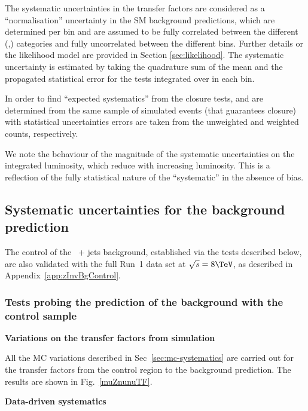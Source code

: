 The systematic uncertainties in the transfer factors are considered as
a ``normalisation'' uncertainty in the SM background predictions,
which are determined per \scalht bin and are
assumed to be fully correlated between the different (\njet,\nb)
categories and fully uncorrelated between the different \scalht bins. 
Further details or the likelihood model
are provided in Section \ref{sec:likelihood}. The systematic
uncertainty is estimated by taking the quadrature sum of the 
mean and the propagated statistical error for the tests integrated
over \njet in each \scalht bin.

In order to find ``expected systematics'' from the closure tests, \nobs and \npre are
determined from the same sample of simulated events (that guarantees
closure) with statistical uncertainties errors are taken from the
unweighted and weighted counts, respectively. 

We note the behaviour of the magnitude of the systematic uncertainties
on the integrated luminosity, which reduce with increasing
luminosity. This is a reflection of the fully statistical nature of
the ``systematic'' in the absence of bias.

\subsection{Systematic uncertainties for the \znunu background
prediction}

The control of the \znunu\ + jets background, established via the
tests described below, are also validated with the full Run~1 data set
at $\sqrt{s} = 8\tev$, as described in
Appendix~\ref{app:zInvBgControl}.

\subsubsection{Tests probing the prediction of the \znunu
background with the \mj control sample}
\label{sec:muZnunu}

{\bf Variations on the transfer factors from simulation}

All the MC variations described in Sec~\ref{sec:mc-systematics} are
carried out for the transfer factors from the \mj control region to
the \znunu background prediction. The results are shown in
Fig.~\ref{muZnunuTF}.

{\bf Data-driven systematics}

